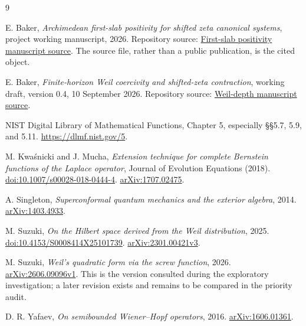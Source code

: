\documentclass[11pt]{article}
\numberwithin{equation}{section}
\theoremstyle{definition}
\theoremstyle{remark}
\begin{document}
\begin{thebibliography}{9}
\raggedright

E. Baker, \emph{Archimedean first-slab positivity for shifted zeta canonical systems}, project working
manuscript, 2026. Repository source:
\href{../../../../shifted-zeta/first-slab-positivity/first_slab_positivity.tex}{First-slab positivity manuscript source}.
The source file, rather than a public publication, is the cited object.

E. Baker, \emph{Finite-horizon Weil coercivity and shifted-zeta contraction},
working draft, version 0.4, 10 September 2026. Repository source:
\href{../../../../shifted-zeta/weil-depth/manuscript/finite_horizon_weil.tex}{Weil-depth manuscript source}.

NIST Digital Library of Mathematical Functions, Chapter 5,
especially \S\S5.7, 5.9, and 5.11.
\url{https://dlmf.nist.gov/5}.

M. Kwa\'snicki and J. Mucha,
\emph{Extension technique for complete Bernstein functions of the Laplace
operator}, Journal of Evolution Equations (2018).
\href{https://doi.org/10.1007/s00028-018-0444-4}{doi:10.1007/s00028-018-0444-4}.
\href{https://arxiv.org/abs/1707.02475}{arXiv:1707.02475}.

A. Singleton, \emph{Superconformal quantum mechanics and the exterior
algebra}, 2014. \href{https://arxiv.org/abs/1403.4933}{arXiv:1403.4933}.

M. Suzuki, \emph{On the Hilbert space derived from the Weil distribution},
2025. \href{https://doi.org/10.4153/S0008414X25101739}{doi:10.4153/S0008414X25101739}.
\href{https://arxiv.org/abs/2301.00421v3}{arXiv:2301.00421v3}.

M. Suzuki, \emph{Weil's quadratic form via the screw function}, 2026.
\href{https://arxiv.org/abs/2606.09096v1}{arXiv:2606.09096v1}.
This is the version consulted during the exploratory investigation;
a later revision exists and remains to be compared in the priority audit.

D. R. Yafaev, \emph{On semibounded Wiener--Hopf operators}, 2016.
\href{https://arxiv.org/abs/1606.01361}{arXiv:1606.01361}.

\end{thebibliography}
\end{document}
